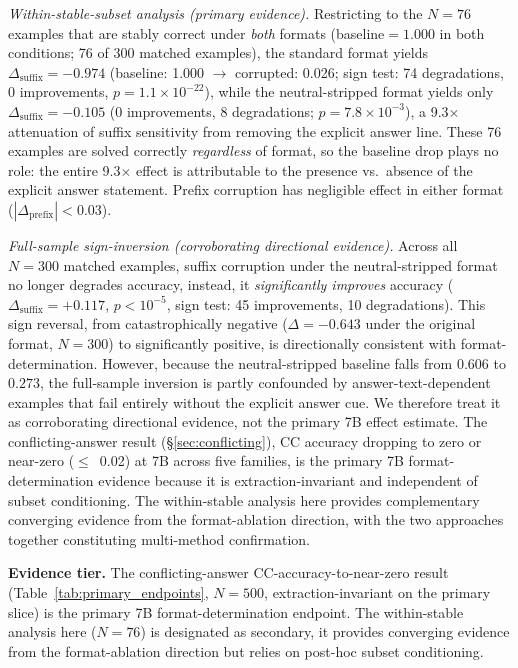 \documentclass{article}
\theoremstyle{definition}
\theoremstyle{definition}
\begin{document}
\emph{Within-stable-subset analysis (primary evidence).}
Restricting to the $N{=}76$ examples that are stably correct under \emph{both}
formats (baseline${=}1.000$ in both conditions; 76 of 300 matched examples),
the standard format yields
$\Delta_\mathrm{suffix}{=}{-}0.974$ (baseline: 1.000 $\to$ corrupted: 0.026;
sign test: 74 degradations, 0 improvements, $p = 1.1 \times 10^{-22}$), while the
neutral-stripped format yields only $\Delta_\mathrm{suffix}{=}{-}0.105$ (0 improvements,
8 degradations; $p{=}7.8\times 10^{-3}$), a 9.3$\times$ attenuation of suffix sensitivity
from removing the explicit answer line.
These 76 examples are solved correctly \emph{regardless} of format, so
the baseline drop plays no role: the entire 9.3$\times$ effect is attributable
to the presence vs.\ absence of the explicit answer statement.
Prefix corruption has negligible effect in either format
($|\Delta_\text{prefix}|{<}0.03$).

\emph{Full-sample sign-inversion (corroborating directional evidence).}
Across all $N{=}300$ matched examples, suffix corruption under the
neutral-stripped format no longer degrades accuracy, instead, it \emph{significantly improves}
accuracy ($\Delta_\text{suffix}{=}{+}0.117$, $p{<}10^{-5}$, sign test: 45
improvements, 10 degradations). This sign reversal, from catastrophically
negative ($\Delta{=}{-}0.643$ under the original format, $N{=}300$) to significantly
positive, is directionally consistent with format-determination. However,
because the neutral-stripped baseline falls from $0.606$ to $0.273$, the
full-sample inversion is partly confounded by answer-text-dependent examples
that fail entirely without the explicit answer cue. We therefore treat it as
corroborating directional evidence, not the primary 7B effect estimate.
The conflicting-answer result (\S\ref{sec:conflicting}), CC accuracy
dropping to zero or near-zero ($\leq$~0.02) at 7B across five families, is the primary 7B
format-determination evidence because it is extraction-invariant and
independent of subset conditioning. The within-stable analysis here
provides complementary converging evidence from the format-ablation
direction, with the two approaches together constituting multi-method
confirmation.

\textbf{Evidence tier.} The conflicting-answer CC-accuracy-to-near-zero result
(Table~\ref{tab:primary_endpoints}, $N{=}500$, extraction-invariant on the primary slice)
is the primary 7B format-determination endpoint. The within-stable analysis here
($N{=}76$) is designated as secondary, it provides converging evidence from the
format-ablation direction but relies on post-hoc subset conditioning.
\end{document}
